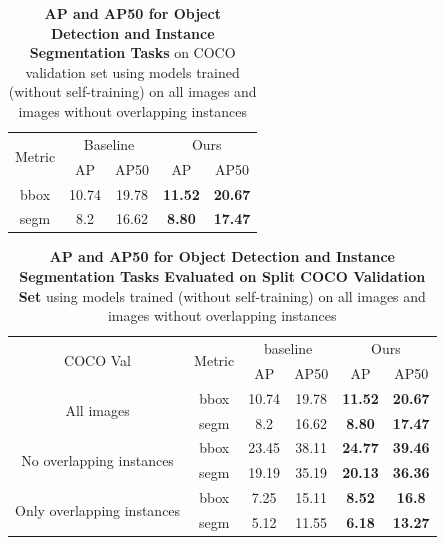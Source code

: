 \begin{table}[htbp]
	\centering
	\begin{tabular}{c|cc|cc}
		\toprule
		\multirow{2}{*}{Metric} & \multicolumn{2}{c|}{Baseline} & \multicolumn{2}{c}{Ours} \\ \cmidrule{2-5}
		& AP & AP50 & AP & AP50 \\ \midrule
		bbox & 10.74 & 19.78 & \textbf{11.52} & \textbf{20.67} \\
		\midrule
		segm & 8.2 & 16.62 & \textbf{8.80} & \textbf{17.47} \\
		\bottomrule
	\end{tabular}
	\caption[\textbf{Evaluation of Models Trained With and Without Overlapping Instances }]{\textbf{AP and AP50 for Object Detection and Instance Segmentation Tasks} on COCO validation set using models trained (without self-training) on all images and images without overlapping instances}
	\label{tab:overlap_analysis}
\end{table}

\begin{table}[htbp]
	\centering
	\begin{tabular}{c|c|cc|cc}
		\toprule
		\multirow{2}{*}{COCO Val} & \multirow{2}{*}{Metric} & \multicolumn{2}{c|}{baseline} & \multicolumn{2}{c}{Ours} \\ \cmidrule{3-6}
		& & AP & AP50 & AP & AP50 \\ \midrule
		\multirow{2}{*}{All images} & bbox & 10.74 & 19.78 & \textbf{11.52} & \textbf{20.67} \\ 
		& segm & 8.2 & 16.62 & \textbf{8.80} & \textbf{17.47}  \\ \midrule
		\multirow{2}{*}{No overlapping instances} & bbox & 23.45 & 38.11 & \textbf{24.77} & \textbf{39.46} \\
		& segm & 19.19 & 35.19  & \textbf{20.13} & \textbf{36.36} \\
		\midrule
		\multirow{2}{*}{Only overlapping instances} & bbox & 7.25 & 15.11 & \textbf{8.52} & \textbf{16.8} \\ 
		& segm & 5.12 & 11.55 & \textbf{6.18} & \textbf{13.27} \\
		\bottomrule
	\end{tabular}
	\caption[\textbf{Evaluation of Models Trained With and Without Overlapping Instances With Evaluation Dataset Split}]{\textbf{AP and AP50 for Object Detection and Instance Segmentation Tasks Evaluated on Split COCO Validation Set} using models trained (without self-training) on all images and images without overlapping instances}
	\label{tab:combined_overlap_eval}
\end{table}

